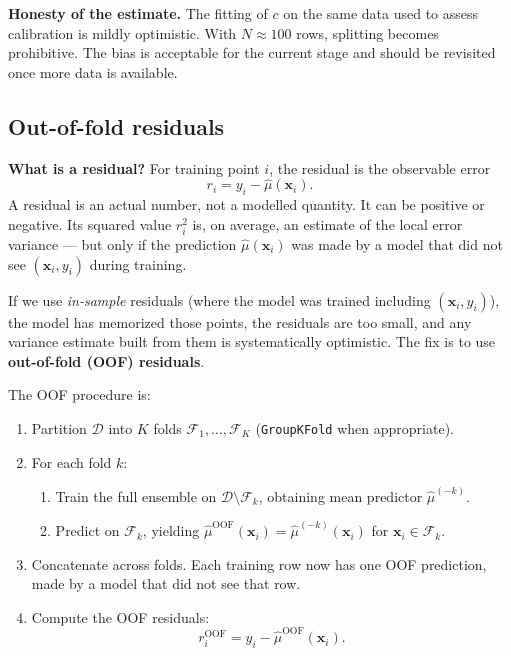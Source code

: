 \documentclass[11pt,a4paper]{article}
\begin{document}
\begin{cautionbox}
\textbf{Honesty of the estimate.} The fitting of $c$ on the same data used to assess calibration is mildly optimistic. With $N \approx 100$ rows, splitting becomes prohibitive. The bias is acceptable for the current stage and should be revisited once more data is available.
\end{cautionbox}

\subsection{Out-of-fold residuals}
\label{sec:oof}

\begin{recapbox}
\textbf{What is a residual?} For training point $i$, the residual is the observable error
\[
r_i = y_i - \hat\mu(\bm x_i).
\]
A residual is an actual number, not a modelled quantity. It can be positive or negative. Its squared value $r_i^2$ is, on average, an estimate of the local error variance --- but only if the prediction $\hat\mu(\bm x_i)$ was made by a model that did not see $(\bm x_i, y_i)$ during training.
\end{recapbox}

\begin{cautionbox}
If we use \emph{in-sample} residuals (where the model was trained including $(\bm x_i, y_i)$), the model has memorized those points, the residuals are too small, and any variance estimate built from them is systematically optimistic. The fix is to use \textbf{out-of-fold (OOF) residuals}.
\end{cautionbox}

The OOF procedure is:
\begin{enumerate}
    \item Partition $\mathcal{D}$ into $K$ folds $\mathcal{F}_1, \ldots, \mathcal{F}_K$ (\texttt{GroupKFold} when appropriate).
    \item For each fold $k$:
    \begin{enumerate}
        \item Train the full ensemble on $\mathcal{D} \setminus \mathcal{F}_k$, obtaining mean predictor $\hat\mu^{(-k)}$.
        \item Predict on $\mathcal{F}_k$, yielding $\hat\mu^{\text{OOF}}(\bm x_i) = \hat\mu^{(-k)}(\bm x_i)$ for $\bm x_i \in \mathcal{F}_k$.
    \end{enumerate}
    \item Concatenate across folds. Each training row now has one OOF prediction, made by a model that did not see that row.
    \item Compute the OOF residuals:
    \begin{equation}
    r_i^{\text{OOF}} = y_i - \hat\mu^{\text{OOF}}(\bm x_i).
    \label{eq:oof-residuals}
    \end{equation}
\end{enumerate}
\end{document}
